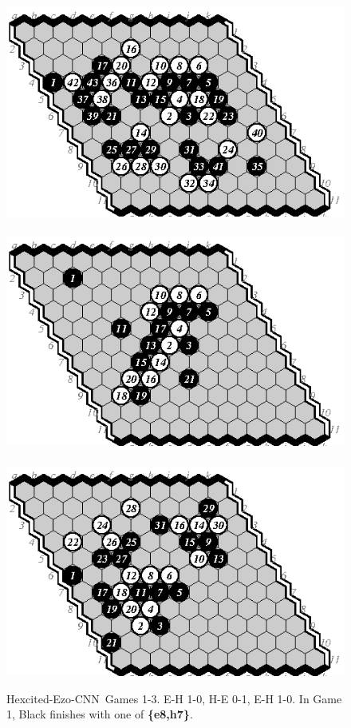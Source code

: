 \documentclass{IOS-Book-Article}
\def\Ec{\mbox{\sc Ezo-CNN}}
\def\Hite{\mbox{\sc Hexcited}}
\begin{document}
\begin{figure}
\hspace*{-2cm}\
\includegraphics[]{pix/11.eh1.eps}\hspace*{-1.5cm}\
\includegraphics[]{pix/11.he2.eps}\hspace*{-1.5cm}\
\includegraphics[]{pix/11.eh3.eps}
\caption{\Hite-\Ec\ Games 1-3. E-H 1-0, H-E 0-1, E-H 1-0.
In Game 1, Black finishes with one of {\bf \{e8,h7\}}.}
\end{figure}
\end{document}
